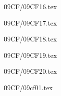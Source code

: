 \documentclass[9pt, xcolor={svgnames, x11names},professionalfonts]{beamer}
\def\scale{1}
\begin{document}

\begin{frame}{09CF/09CF16.tex}
	
\end{frame}


\begin{frame}{09CF/09CF17.tex}
	
\end{frame}


\begin{frame}{09CF/09CF18.tex}
	
\end{frame}


\begin{frame}{09CF/09CF19.tex}
	
\end{frame}


\begin{frame}{09CF/09CF20.tex}
	
\end{frame}


\begin{frame}{09CF/09cf01.tex}
	\def\scale{0.65}
	
\end{frame}








\end{document}
